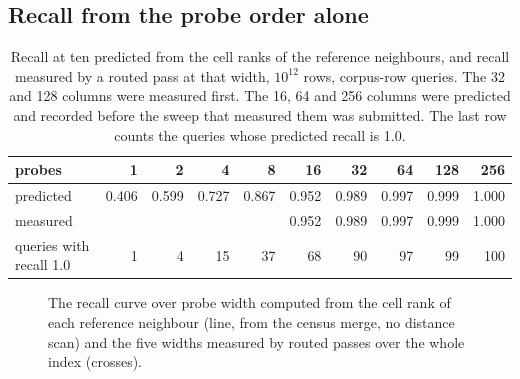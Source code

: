 \documentclass[sigconf, nonacm]{acmart}
\begin{document}
\subsection{Recall from the probe order alone}
\label{sec:reach}

\begin{table}[t]
\caption{Recall at ten predicted from the cell ranks of the reference neighbours, and recall
measured by a routed pass at that width, $10^{12}$ rows, corpus-row queries. The 32 and 128
columns were measured first. The 16, 64 and 256 columns were predicted and recorded before the
sweep that measured them was submitted. The last row counts the queries whose predicted recall is
1.0.}
\label{tab:reach}
\centering
\footnotesize
\setlength{\tabcolsep}{2.4pt}
\begin{tabular}{lrrrrrrrrr}
\toprule
probes & 1 & 2 & 4 & 8 & 16 & 32 & 64 & 128 & 256 \\
\midrule
predicted & 0.406 & 0.599 & 0.727 & 0.867 & 0.952 & 0.989 & 0.997 & 0.999 & 1.000 \\
measured  &       &       &       &       & 0.952 & 0.989 & 0.997 & 0.999 & 1.000 \\
queries with recall 1.0 & 1 & 4 & 15 & 37 & 68 & 90 & 97 & 99 & 100 \\
\bottomrule
\end{tabular}
\end{table}

\begin{figure}[t]
\centering
{}
\caption{The recall curve over probe width computed from the cell rank of each reference
neighbour (line, from the census merge, no distance scan) and the five widths measured by routed
passes over the whole index (crosses).}
\label{fig:reach}
\end{figure}
\end{document}
